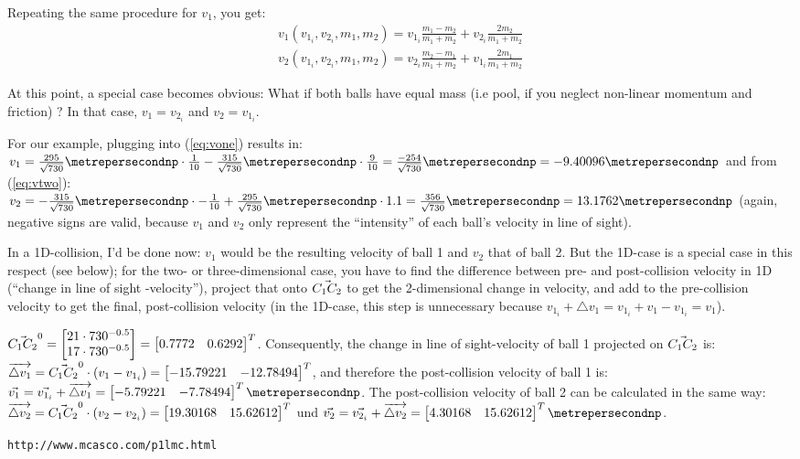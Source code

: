 \documentclass[math,plainoldenumerate,afour]{homework}
\begin{document}
Repeating the same procedure for $v_1$, you get:
\begin{gather}
  \label{eq:vone}
  v_1(v_{1_i},v_{2_i},m_1,m_2)=
  v_{1_i}\frac{m_1-m_2}{m_1+m_2}+v_{2_i}\frac{2m_2}{m_1+m_2} \\
  \label{eq:vtwo}
  v_2(v_{1_i},v_{2_i},m_1,m_2)=
  v_{2_i}\frac{m_2-m_1}{m_1+m_2}+v_{1_i}\frac{2m_1}{m_1+m_2}
\end{gather}

At this point, a special case becomes obvious: What if both balls
have equal mass (i.e pool, if you neglect non-linear momentum and friction) ?
In that case, $v_1=v_{2_i}$ and $v_2=v_{1_i}$.

For our example, plugging into (\ref{eq:vone}) results in: \\
$v_1=\frac{295}{\sqrt{730}}\metrepersecondnp\cdot\frac{1}{10}
-\frac{315}{\sqrt{730}}\metrepersecondnp\cdot\frac{9}{10}
=\frac{-254}{\sqrt{730}}\metrepersecondnp=-9.40096\metrepersecondnp$
and from (\ref{eq:vtwo}): \\
$v_2=-\frac{315}{\sqrt{730}}\metrepersecondnp\cdot-\frac{1}{10}+
\frac{295}{\sqrt{730}}\metrepersecondnp\cdot 1.1
=\frac{356}{\sqrt{730}}\metrepersecondnp=13.1762\metrepersecondnp$
(again, negative signs are valid, because $v_1$ and $v_2$ only 
represent the ``intensity'' of each ball's velocity in line of sight).

In a 1D-collision, I'd be done now: $v_1$ would be the resulting velocity
of ball 1 and $v_2$ that of ball 2. But the 1D-case is a special case
in this respect (see below); for the two- or three-dimensional case,
you have to find the difference between pre- and post-collision velocity
in 1D (``change in line of sight -velocity''), project that onto $\vec{C_1C_2}$
to get the 2-dimensional change in velocity, and add to the pre-collision
velocity to get the final, post-collision velocity (in the 1D-case, this
step is unnecessary because $v_{1_i}+\triangle v_1=v_{1_i}+v_1-v_{1_i}=v_1$).

$\vec{C_1C_2}^0 = \begin{bmatrix}21\cdot {730}^{-0.5} \\ 17\cdot {730}^{-0.5}\end{bmatrix}
=\begin{bmatrix}0.7772 & 0.6292\end{bmatrix}^T$.
Consequently, the change in line of sight-velocity of ball 1 projected
on $\vec{C_1C_2}$ is:
$\overrightarrow{\triangle v_1}=\vec{C_1C_2}^0\cdot(v_1-v_{1_i})
=\begin{bmatrix}-15.79221 & -12.78494\end{bmatrix}^T$,
and therefore the post-collision velocity of ball 1 is:
$\vone = \vonei + \overrightarrow{\triangle v_1}
=\flatvectortwo{-5.79221}{-7.78494}\metrepersecondnp$.
The post-collision velocity of ball 2 can be calculated in the same way:
$\overrightarrow{\triangle v_2}=\vec{C_1C_2}^0\cdot(v_2-v_{2_i})
=\begin{bmatrix}19.30168 & 15.62612\end{bmatrix}^T$
und $\vec{v_2}=\vec{v_{2_i}}+\overrightarrow{\triangle v_2}
=\flatvectortwo{4.30168}{15.62612}\metrepersecondnp$.

\begin{thebibliography}{1}
 \texttt{http://www.mcasco.com/p1lmc.html}
\end{thebibliography}
\end{document}
